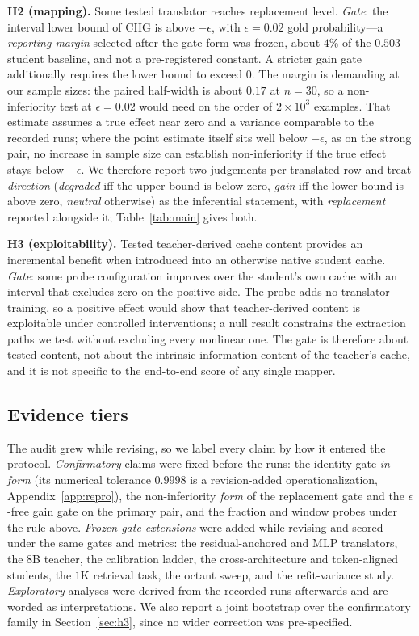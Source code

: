 \documentclass{article} %
\begin{document}
\textbf{H2 (mapping).} Some tested translator reaches replacement level.
\emph{Gate}: the interval lower bound of CHG is above $-\epsilon$, with
$\epsilon=0.02$ gold probability---a \emph{reporting margin} selected after the
gate form was frozen, about $4\%$ of the $0.503$ student baseline, and not a
pre-registered constant. A stricter gain gate additionally requires the lower
bound to exceed $0$. The margin is demanding at our sample sizes: the paired
half-width is about $0.17$ at $n{=}30$, so a non-inferiority test at
$\epsilon{=}0.02$ would need on the order of $2\times10^{3}$ examples. That
estimate assumes a true effect near zero and a variance comparable to the
recorded runs; where the point estimate itself sits well below $-\epsilon$, as
on the strong pair, no increase in sample size can establish non-inferiority if the true effect stays below $-\epsilon$. We
therefore report two judgements per translated row and treat \emph{direction}
(\emph{degraded} iff the upper bound is below zero, \emph{gain} iff the lower
bound is above zero, \emph{neutral} otherwise) as the inferential statement,
with \emph{replacement} reported alongside it; Table~\ref{tab:main} gives both.

\textbf{H3 (exploitability).} Tested teacher-derived cache content provides an
incremental benefit when introduced into an otherwise native student cache.
\emph{Gate}: some probe configuration improves over the student's own cache with
an interval that excludes zero on the positive side. The probe adds no translator
training, so a positive effect would show that teacher-derived content is
exploitable under controlled interventions; a null result constrains the
extraction paths we test without excluding every nonlinear one. The gate is
therefore about tested content, not about the intrinsic information content of
the teacher's cache, and it is not specific to the end-to-end score of any
single mapper.

\subsection{Evidence tiers}
\label{sec:tiers}
The audit grew while revising, so we label every claim by how it entered the
protocol. \emph{Confirmatory} claims were fixed before the runs: the identity
gate \emph{in form} (its numerical tolerance $0.9998$ is a revision-added
operationalization, Appendix~\ref{app:repro}), the non-inferiority
\emph{form} of the replacement gate and the
$\epsilon$-free gain gate on the primary pair, and the fraction and window
probes under the rule above. \emph{Frozen-gate extensions} were added while
revising and scored under the same gates and metrics: the residual-anchored and
MLP translators, the $8$B teacher, the calibration ladder, the
cross-architecture and token-aligned students, the $1$K retrieval task, the
octant sweep, and the refit-variance study. \emph{Exploratory} analyses were
derived from the recorded runs afterwards and are worded as interpretations. We
also report a joint bootstrap over the confirmatory family in
Section~\ref{sec:h3}, since no wider correction was pre-specified.
\end{document}
